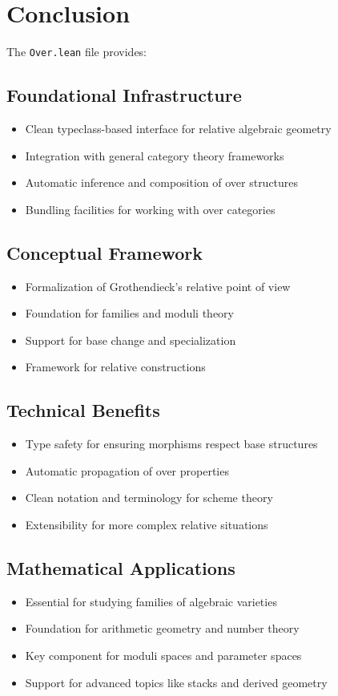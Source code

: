 \documentclass{article}
\theoremstyle{definition}
\begin{document}
\section{Conclusion}

The \texttt{Over.lean} file provides:

\subsection{Foundational Infrastructure}
\begin{itemize}
\item Clean typeclass-based interface for relative algebraic geometry
\item Integration with general category theory frameworks
\item Automatic inference and composition of over structures
\item Bundling facilities for working with over categories
\end{itemize}

\subsection{Conceptual Framework}
\begin{itemize}
\item Formalization of Grothendieck's relative point of view
\item Foundation for families and moduli theory
\item Support for base change and specialization
\item Framework for relative constructions
\end{itemize}

\subsection{Technical Benefits}
\begin{itemize}
\item Type safety for ensuring morphisms respect base structures
\item Automatic propagation of over properties
\item Clean notation and terminology for scheme theory
\item Extensibility for more complex relative situations
\end{itemize}

\subsection{Mathematical Applications}
\begin{itemize}
\item Essential for studying families of algebraic varieties
\item Foundation for arithmetic geometry and number theory
\item Key component for moduli spaces and parameter spaces
\item Support for advanced topics like stacks and derived geometry
\end{itemize}
\end{document}
